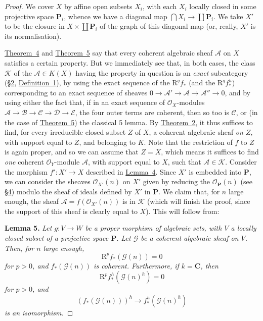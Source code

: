 \documentclass{article}
\newenvironment{itenv}[1]
  {\smallskip\noindent\textbf{#1.}\itshape}
  {\smallskip}
\newcommand{\scr}[1]{{\mathscr{#1}}}
\renewcommand{\cal}[1]{{\mathcal{#1}}}
\newcommand{\RR}{\mathrm{R}}
\begin{document}
\begin{proof}
  We cover $X$ by affine open subsets $X_i$, with each $X_i$ locally closed in some projective space $\mathbf{P}_i$, whence we have a diagonal map $\bigcap X_i\to\coprod\mathbf{P}_i$.
  We take $X'$ to be the closure in $X\times\coprod\mathbf{P}_i$ of the graph of this diagonal map (or, really, $X'$ is its normalisation).

  \hyperref[theorem4]{Theorem~4} and \hyperref[theorem5]{Theorem~5} say that every coherent algebraic sheaf $\scr{A}$ on $X$ satisfies a certain property.
  But we immediately see that, in both cases, the class $\cal{K}$ of the $\scr{A}\in K(X)$ having the property in question is an \emph{exact} subcategory (\hyperref[section2]{\S2}, \hyperref[definition1]{Definition~1}), by using the exact sequence of the $\RR^qf_*$ (and the $\RR^qf_*^h$) corresponding to an exact sequence of sheaves $0\to\scr{A}'\to\scr{A}\to\scr{A}''\to0$, and by using either the fact that, if in an exact sequence of $\scr{O}_X$-modules $\scr{A}\to\scr{B}\to\scr{C}\to\scr{D}\to\scr{E}$, the four outer terms are coherent, then so too is $\scr{C}$, or (in the case of \hyperref[theorem5]{Theorem~5}) the classical 5 lemma.
  By \hyperref[theorem2]{Theorem~2}, it thus suffices to find, for every irreducible closed subset $Z$ of $X$, a coherent algebraic sheaf \emph{on $Z$}, with support equal to $Z$, and belonging to $K$.
  Note that the restriction of $f$ to $Z$ is again proper, and so we can assume that $Z=X$, which means it suffices to find \emph{one} coherent $\scr{O}_Y$-module $\scr{A}$, with support equal to $X$, such that $\scr{A}\in\cal{K}$.
  Consider the morphism $f'\colon X'\to X$ described in \hyperref[lemma4]{Lemma~4}.
  Since $X'$ is embedded into $\mathbf{P}$, we can consider the sheaves $\scr{O}_{X'}(n)$ on $X'$ given by reducing the $\scr{O}_\mathbf{P}(n)$ (see \hyperref[section4]{\S4}) modulo the sheaf of ideals defined by $X'$ in $\mathbf{P}$.
  We claim that, for $n$ large enough, the sheaf $\scr{A}=f(\scr{O}_{X'}(n))$ is in $\cal{K}$ (which will finish the proof, since the support of this sheaf is clearly equal to $X$).
  This will follow from:

  \begin{itenv}{Lemma 5}
  \label{lemma5}
    Let $g\colon V\to W$ be a \emph{proper} morphism of algebraic sets, with $V$ a locally closed subset of a projective space $\mathbf{P}$.
    Let $\scr{G}$ be a coherent algebraic sheaf on $V$.
    Then, for $n$ large enough, \[\RR^pf_*(\scr{G}(n))=0\] for $p>0$, and $f_*(\scr{G}(n))$ is coherent.
    Furthermore, if $k=\mathbf{C}$, then \[\RR^pf_*^h(\scr{G}(n)^h)=0\] for $p>0$, and \[(f_*(\scr{G}(n)))^h\to f_*^h(\scr{G}(n)^h)\] is an isomorphism.
  \end{itenv}


\end{proof}
\end{document}
